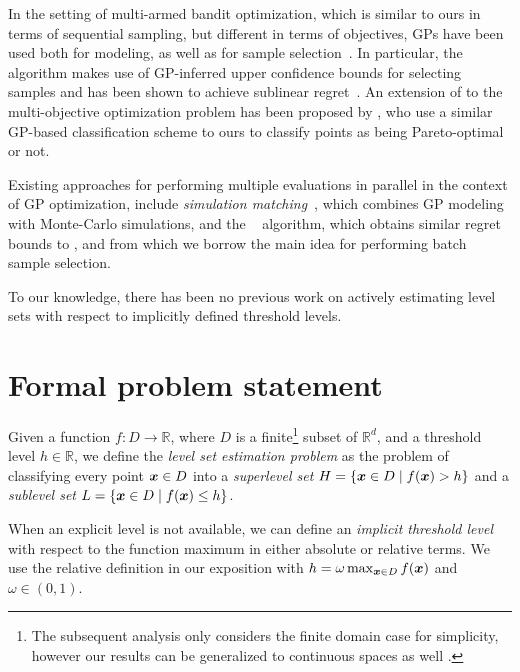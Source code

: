 In the setting of multi-armed bandit optimization, which is similar to ours
in terms of sequential sampling, but different in terms of objectives,
GPs have been used both for modeling, as well as for sample
selection~\mbox{\cite{brochu10}}. In particular, the \gpucb algorithm
makes use of GP-inferred upper confidence bounds for selecting samples and
has been shown to achieve sublinear regret~\cite{srinivas10}.
An extension of \gpucb to the multi-objective
optimization problem has been proposed by
\citet{zuluaga13}, who use a similar GP-based
classification scheme to ours to classify points as being Pareto-optimal
or not.

Existing approaches for performing multiple evaluations in
parallel in the context of GP optimization, include
\emph{simulation matching}~\cite{azimi10}, which combines GP modeling with
Monte-Carlo simulations, and the \gpbucb~\cite{desautels12} algorithm,
which obtains similar regret bounds to \gpucb, and from which we borrow
the main idea for performing batch sample selection.

To our knowledge, there has been no previous work on actively estimating
level sets with respect to implicitly defined threshold levels.

\section{Formal problem statement} \label{sect:prelim}

Given a function ${f : D \to \mathbb{R}}$, where $D$ is a
finite\footnote{The subsequent analysis only considers the finite domain case
for simplicity, however our results can be generalized to continuous spaces
as well \citep[cf.][]{srinivas10}.}
subset of $\mathbb{R}^d$, and a threshold level ${h \in \mathbb{R}}$,
we define the \emph{level set estimation problem} as the problem of classifying
every point $\bm{x} \in D$ into a \emph{superlevel set}
${H = \{\bm{x} \in D \mid f(\bm{x}) > h\}}$ and a \emph{sublevel set}
${L = \{\bm{x} \in D \mid f(\bm{x}) \leq h\}}$.

When an explicit level is not available, we can define an
\emph{implicit threshold level}
with respect to the function maximum in either absolute or relative terms.
We use the relative definition in our exposition with
${h = \omega \max_{\bm{x}\in D} f(\bm{x})}$
and $\omega \in (0, 1)$.

